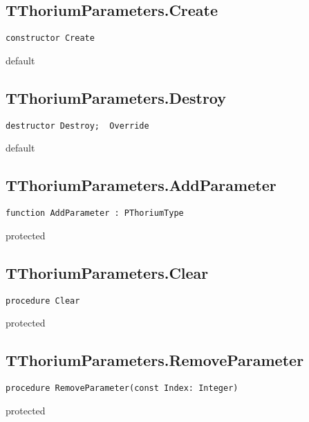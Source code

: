 \subsection{TThoriumParameters.Create}
\label{thoriumcorepkg:thorium:tthoriumparameters:create}
\begin{FPCList}
\Declaration 

\begin{verbatim}
constructor Create
\end{verbatim}
\Visibility
default
\end{FPCList}
\subsection{TThoriumParameters.Destroy}
\label{thoriumcorepkg:thorium:tthoriumparameters:destroy}
\begin{FPCList}
\Declaration 

\begin{verbatim}
destructor Destroy;  Override
\end{verbatim}
\Visibility
default
\end{FPCList}
\subsection{TThoriumParameters.AddParameter}
\label{thoriumcorepkg:thorium:tthoriumparameters:addparameter}
\begin{FPCList}
\Declaration 

\begin{verbatim}
function AddParameter : PThoriumType
\end{verbatim}
\Visibility
protected
\end{FPCList}
\subsection{TThoriumParameters.Clear}
\label{thoriumcorepkg:thorium:tthoriumparameters:clear}
\begin{FPCList}
\Declaration 

\begin{verbatim}
procedure Clear
\end{verbatim}
\Visibility
protected
\end{FPCList}
\subsection{TThoriumParameters.RemoveParameter}
\label{thoriumcorepkg:thorium:tthoriumparameters:removeparameter}
\begin{FPCList}
\Declaration 

\begin{verbatim}
procedure RemoveParameter(const Index: Integer)
\end{verbatim}
\Visibility
protected
\end{FPCList}
